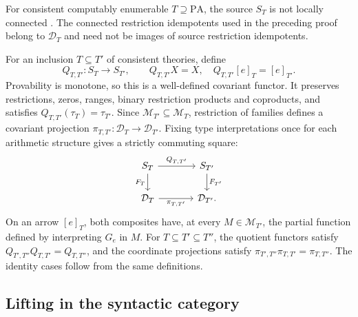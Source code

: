 \documentclass[11pt]{article}
\newcommand{\PA}{\mathrm{PA}}
\begin{document}
For consistent computably enumerable $T\supseteq\PA$, the source $S_T$
is not locally connected \cite[Corollary 4.4, pp.~657--658]{DPM}.
The connected restriction idempotents used in the preceding proof
belong to $\mathcal D_T$ and need not be images of source restriction
idempotents.

For an inclusion $T\subseteq T'$ of consistent theories, define
\[
 Q_{T,T'}:S_T\to S_{T'},\qquad
 Q_{T,T'}X=X,\quad Q_{T,T'}[e]_T=[e]_{T'}.
\]
Provability is monotone, so this is a well-defined covariant functor.
It preserves restrictions, zeros, ranges, binary restriction products
and coproducts, and satisfies $Q_{T,T'}(\tau_T)=\tau_{T'}$.
Since $\mathcal M_{T'}\subseteq\mathcal M_T$, restriction of families
defines a covariant projection
$\pi_{T,T'}:\mathcal D_T\to\mathcal D_{T'}$. Fixing type interpretations
once for each arithmetic structure gives a strictly commuting square:
\[
\begin{tikzcd}[column sep=large]
 S_T \arrow[r,"Q_{T,T'}"] \arrow[d,"F_T"'] &
 S_{T'} \arrow[d,"F_{T'}"]\\
 \mathcal D_T \arrow[r,"\pi_{T,T'}"'] & \mathcal D_{T'}.
\end{tikzcd}
\]
On an arrow $[e]_T$, both composites have, at every
$M\in\mathcal M_{T'}$, the partial function defined by interpreting
$G_e$ in $M$. For $T\subseteq T'\subseteq T''$, the quotient
functors satisfy $Q_{T',T''}Q_{T,T'}=Q_{T,T''}$, and the coordinate
projections satisfy
$\pi_{T',T''}\pi_{T,T'}=\pi_{T,T''}$.
The identity cases follow from the same definitions.

\subsection{Lifting in the syntactic category}
\end{document}

